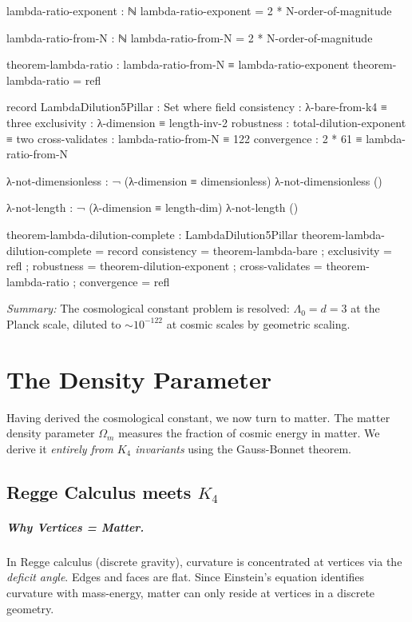 \documentclass[11pt,a4paper]{book}
\begin{document}
\begin{code}
  lambda-ratio-exponent : ℕ
  lambda-ratio-exponent = 2 * N-order-of-magnitude
  
  lambda-ratio-from-N : ℕ
  lambda-ratio-from-N = 2 * N-order-of-magnitude
  
  theorem-lambda-ratio : lambda-ratio-from-N ≡ lambda-ratio-exponent
  theorem-lambda-ratio = refl
  
  record LambdaDilution5Pillar : Set where
    field
      consistency     : λ-bare-from-k4 ≡ three
      exclusivity     : λ-dimension ≡ length-inv-2
      robustness      : total-dilution-exponent ≡ two
      cross-validates : lambda-ratio-from-N ≡ 122
      convergence     : 2 * 61 ≡ lambda-ratio-from-N
  
  λ-not-dimensionless : ¬ (λ-dimension ≡ dimensionless)
  λ-not-dimensionless ()
  
  λ-not-length : ¬ (λ-dimension ≡ length-dim)
  λ-not-length ()
      
  theorem-lambda-dilution-complete : LambdaDilution5Pillar
  theorem-lambda-dilution-complete = record
    { consistency     = theorem-lambda-bare
    ; exclusivity     = refl
    ; robustness      = theorem-dilution-exponent
    ; cross-validates = theorem-lambda-ratio
    ; convergence     = refl
    }
\end{code}

\medskip
\noindent\textit{Summary:} The cosmological constant problem is resolved: $\Lambda_0 = d = 3$ 
at the Planck scale, diluted to $\sim 10^{-122}$ at cosmic scales by geometric scaling.

\chapter{The Density Parameter}
\label{chap:matter-density-geometry}

Having derived the cosmological constant, we now turn to matter. The matter density 
parameter $\Omega_m$ measures the fraction of cosmic energy in matter. We derive it 
\emph{entirely from $K_4$ invariants} using the Gauss-Bonnet theorem.

\section[Regge Calculus meets K4]{Regge Calculus meets $K_4$}

\paragraph{Why Vertices = Matter.}
In Regge calculus (discrete gravity), curvature is concentrated at vertices via the 
\emph{deficit angle}. Edges and faces are flat. Since Einstein's equation identifies 
curvature with mass-energy, matter can only reside at vertices in a discrete geometry.
\end{document}
